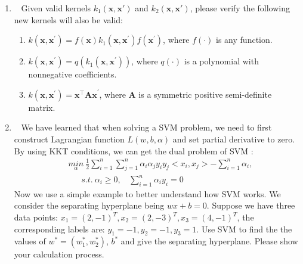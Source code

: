 \documentclass[10pt]{article}
\begin{document}
\begin{enumerate}
        \item ~
        Given valid kernels $k_1(\mathbf{x}, \mathbf{x}')$ and $k_2(\mathbf{x}, \mathbf{x}')$, please verify the following new kernels will also be valid:
	    \begin{enumerate}
		    \item $k\left(\mathbf{x}, \mathbf{x}^{\prime}\right)=f(\mathbf{x}) k_{1}\left(\mathbf{x}, \mathbf{x}^{\prime}\right) f\left(\mathbf{x}^{\prime}\right)$, where $f(\cdot)$ is any function. ~
		    \item $k(\mathbf{x}, \mathbf{x}^\prime) = q(k_1(\mathbf{x}, \mathbf{x}^\prime))$, where $q(\cdot)$ is a polynomial with nonnegative coefficients. ~
		    \item $k(\mathbf{x}, \mathbf{x}^\prime) = \mathbf{x^\top}\mathbf{Ax}^\prime$, where $\mathbf{A}$ is a symmetric positive semi-definite matrix.~
	    \end{enumerate}

	    \newpage

	    \item ~ We have learned that when solving a SVM problem, we need to first construct Lagrangian function $L(w,b,\alpha)$ and set partial derivative to zero. By using KKT conditions, we can get the dual problem of SVM :
	    \begin{align*}
		    & \underset{\alpha}{min} \  \frac{1}{2}\sum\limits_{i=1}^{n}\sum\limits_{j=1}^{n}\alpha_i \alpha_j y_i y_j <x_i,x_j> - \sum\limits_{i=1}^{n}\alpha_i , \\ & \ \ \ \ \ \ \  s.t. \ \alpha_i \geq 0 , \ \ \ \ \sum\limits_{i=1}^{n}\alpha_i y_i = 0
		\end{align*}
	    Now we use a simple example to better understand how SVM works. We consider the separating hyperplane being $wx + b = 0$. Suppose we have three data points: $x_1 = (2,-1)^T, x_2 = (2,-3)^T, x_3 = (4,-1)^T$, the corresponding labels are: $y_1 = -1, y_2 = -1, y_3 = 1$. Use SVM to find the the values of $w^* = (w_1^*, w_2^*)$, $b^*$ and give the separating hyperplane. Please show your calculation process.


\end{enumerate}
\end{document}
